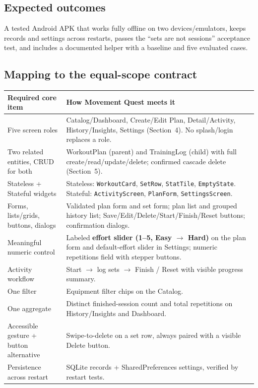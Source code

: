 \documentclass[11pt]{article}
\begin{document}
\subsection*{Expected outcomes}
A tested Android APK that works fully offline on two devices/emulators, keeps records and settings across restarts, passes the ``sets are not sessions'' acceptance test, and includes a documented helper with a baseline and five evaluated cases.

\subsection*{Mapping to the equal-scope contract}
\begin{tabularx}{\textwidth}{@{}P{4.6cm}L@{}}
\toprule
\textbf{Required core item} & \textbf{How Movement Quest meets it} \\
\midrule
Five screen roles & Catalog/Dashboard, Create/Edit Plan, Detail/Activity, History/Insights, Settings (Section~4). No splash/login replaces a role. \\
Two related entities, CRUD for both & WorkoutPlan (parent) and TrainingLog (child) with full create/read/update/delete; confirmed cascade delete (Section~5). \\
Stateless + Stateful widgets & Stateless: \texttt{WorkoutCard}, \texttt{SetRow}, \texttt{StatTile}, \texttt{EmptyState}. Stateful: \texttt{ActivityScreen}, \texttt{PlanForm}, \texttt{SettingsScreen}. \\
Forms, lists/grids, buttons, dialogs & Validated plan form and set form; plan list and grouped history list; Save/Edit/Delete/Start/Finish/Reset buttons; confirmation dialogs. \\
Meaningful numeric control & Labeled \textbf{effort slider (1--5, Easy $\rightarrow$ Hard)} on the plan form and default-effort slider in Settings; numeric repetitions field with stepper buttons. \\
Activity workflow & Start $\rightarrow$ log sets $\rightarrow$ Finish / Reset with visible progress summary. \\
One filter & Equipment filter chips on the Catalog. \\
One aggregate & Distinct finished-session count and total repetitions on History/Insights and Dashboard. \\
Accessible gesture + button alternative & Swipe-to-delete on a set row, always paired with a visible Delete button. \\
Persistence across restart & SQLite records + SharedPreferences settings, verified by restart tests. \\

\end{tabularx}
\end{document}
